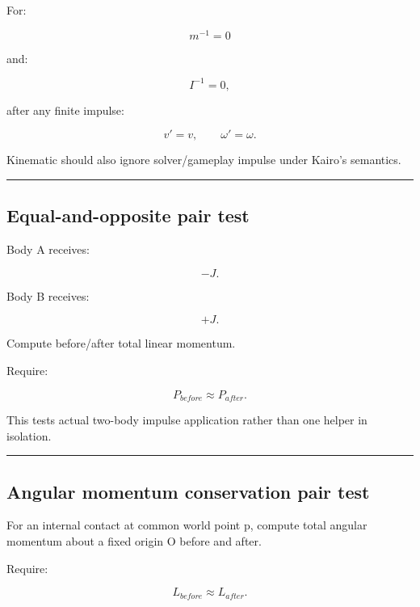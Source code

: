 \hypertarget{06-engine-ii-ch039-static-impulse-test}{}

For:

\[
m^{-1}=0
\]

and:

\[
I^{-1}=0,
\]

after any finite impulse:

\[
v'=v,
\qquad
\omega'=\omega.
\]

Kinematic should also ignore solver/gameplay impulse under Kairo's semantics.

\begin{center}\rule{0.5\linewidth}{0.5pt}\end{center}

\subsection{Equal-and-opposite pair test}\label{06-engine-ii-ch039-equal-and-opposite-pair-test}

\hypertarget{06-engine-ii-ch039-equal-and-opposite-pair-test}{}

Body A receives:

\[
-J.
\]

Body B receives:

\[
+J.
\]

Compute before/after total linear momentum.

Require:

\[
\boxed{
P_{before}\approx P_{after}.
}
\]

This tests actual two-body impulse application rather than one helper in isolation.

\begin{center}\rule{0.5\linewidth}{0.5pt}\end{center}

\subsection{Angular momentum conservation pair test}\label{06-engine-ii-ch039-angular-momentum-conservation-pair-test}

\hypertarget{06-engine-ii-ch039-angular-momentum-conservation-pair-test}{}

For an internal contact at common world point p, compute total angular momentum about a fixed origin O before and after.

Require:

\[
L_{before}\approx L_{after}.
\]

